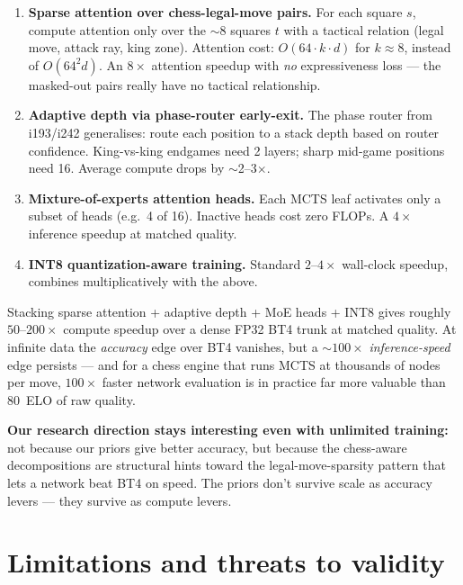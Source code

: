 \documentclass[10pt,a4paper]{article}
\begin{document}
\begin{enumerate}
\item \textbf{Sparse attention over chess-legal-move pairs.} For each
square $s$, compute attention only over the $\sim$8 squares $t$ with a
tactical relation (legal move, attack ray, king zone). Attention cost:
$O(64 \cdot k \cdot d)$ for $k \approx 8$, instead of $O(64^2 d)$. An
$8\times$ attention speedup with \emph{no} expressiveness loss --- the
masked-out pairs really have no tactical relationship.
\item \textbf{Adaptive depth via phase-router early-exit.} The phase
router from i193/i242 generalises: route each position to a stack depth
based on router confidence. King-vs-king endgames need 2 layers; sharp
mid-game positions need 16. Average compute drops by $\sim$2--3$\times$.
\item \textbf{Mixture-of-experts attention heads.} Each MCTS leaf
activates only a subset of heads (e.g.\ 4 of 16). Inactive heads cost zero
FLOPs. A $4\times$ inference speedup at matched quality.
\item \textbf{INT8 quantization-aware training.} Standard $2$--$4\times$
wall-clock speedup, combines multiplicatively with the above.
\end{enumerate}

\begin{tcolorbox}[callout, title=Realistic outcome at unlimited training]
Stacking sparse attention + adaptive depth + MoE heads + INT8 gives roughly
$50$--$200\times$ compute speedup over a dense FP32 BT4 trunk at matched
quality. At infinite data the \emph{accuracy} edge over BT4 vanishes, but a
$\sim 100\times$ \emph{inference-speed} edge persists --- and for a chess
engine that runs MCTS at thousands of nodes per move, $100\times$ faster
network evaluation is in practice far more valuable than $80$~ELO of raw
quality.
\end{tcolorbox}

\textbf{Our research direction stays interesting even with unlimited
training:} not because our priors give better accuracy, but because the
chess-aware decompositions are structural hints toward the
legal-move-sparsity pattern that lets a network beat BT4 on speed. The
priors don't survive scale as accuracy levers --- they survive as compute
levers.

\clearpage
\section{Limitations and threats to validity}
\end{document}
